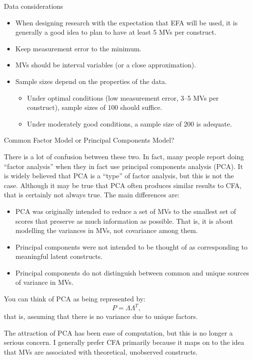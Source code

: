 \documentclass[10pt,ignorenonframetext,]{beamer}
\providecommand{\tightlist}{%
  \setlength{\itemsep}{0pt}\setlength{\parskip}{0pt}}
\begin{document}
\begin{frame}{Data considerations}

\begin{itemize}
\tightlist
\item
  When designing research with the expectation that EFA will be used, it
  is generally a good idea to plan to have at least 5 MVs per
  construct.\\
\item
  Keep measurement error to the minimum.
\item
  MVs should be interval variables (or a close approximation).
\item
  Sample sizes depend on the properties of the data.

  \begin{itemize}
  \tightlist
  \item
    Under optimal conditions (low measurement error, 3--5 MVs per
    construct), sample sizes of 100 should suffice.
  \item
    Under moderately good conditions, a sample size of 200 is adequate.
  \end{itemize}
\end{itemize}

\end{frame}

\begin{frame}{Common Factor Model or Principal Components Model?}

\small
There is a lot of confusion between these two. In fact, many people
report doing ``factor analysis'' when they in fact use principal
components analysis (PCA). It is widely believed that PCA is a ``type''
of factor analysis, but this is not the case. Although it may be true
that PCA often produces similar results to CFA, that is certainly not
always true. The main differences are:

\begin{itemize}
\tightlist
\item
  PCA was originally intended to reduce a set of MVs to the smallest set
  of scores that preserve as much information as possible. That is, it
  is about modelling the variances in MVs, not covariance among them.
\item
  Principal components were not intended to be thought of as
  corresponding to meaningful latent constructs.
\item
  Principal components do not distinguish between common and unique
  sources of variance in MVs.
\end{itemize}

You can think of PCA as being represented by: \[
P = \Lambda\Lambda^T, 
\] that is, assuming that there is no variance due to unique factors.

The attraction of PCA has been ease of computation, but this is no
longer a serious concern. I generally prefer CFA primarily because it
maps on to the idea that MVs are associated with theoretical, unobserved
constructs.

\end{frame}
\end{document}
